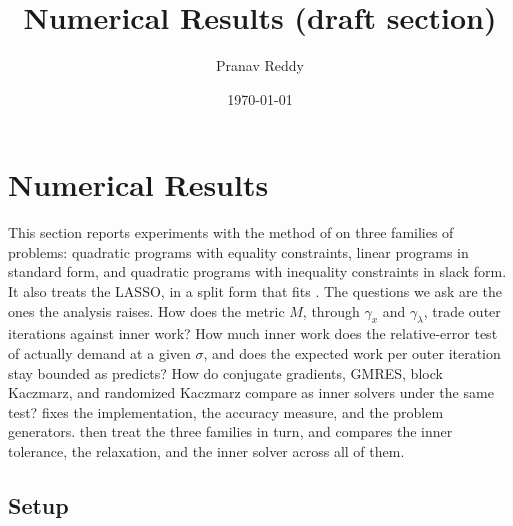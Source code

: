 \documentclass[11pt]{article}
\title{Numerical Results (draft section)}
\author{Pranav Reddy}
\date{\today}
\begin{document}
  \maketitle
\fi

\section{Numerical Results}\label{sec:numerical-results}
This section reports experiments with the method of  on three families of problems: quadratic programs with equality constraints, linear programs in standard form, and quadratic programs with inequality constraints in slack form.
It also treats the LASSO, in a split form that fits .
The questions we ask are the ones the analysis raises.
How does the metric $M$, through $\gamma_x$ and $\gamma_\lambda$, trade outer iterations against inner work?
How much inner work does the relative-error test of  actually demand at a given $\sigma$, and does the expected work per outer iteration stay bounded as  predicts?
How do conjugate gradients, GMRES, block Kaczmarz, and randomized Kaczmarz compare as inner solvers under the same test?
 fixes the implementation, the accuracy measure, and the problem generators.
 then treat the three families in turn, and  compares the inner tolerance, the relaxation, and the inner solver across all of them.

\subsection{Setup}\label{sec:experiments-setup}
\end{document}
